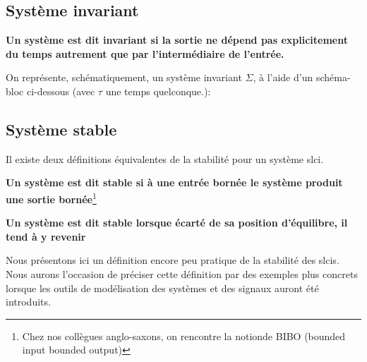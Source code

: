 \subsection{Système invariant}
\textbf{Un système est dit invariant si la sortie ne dépend pas 
explicitement du temps autrement que par l'intermédiaire de l'entrée.}

On représente, schématiquement, un système invariant $\Sigma$, à 
l'aide d'un schéma-bloc ci-dessous 
(avec $\tau$ une temps quelconque.): 
\begin{center}
\end{center}

\subsection{Système stable}
Il existe deux définitions équivalentes de la stabilité pour un 
système \gls{slci}.

\textbf{Un système est dit stable si à une entrée bornée le système 
produit une sortie bornée}\footnote{Chez nos collègues anglo-saxons, on 
rencontre la notionde BIBO (\og bounded input bounded output\fg)}

\textbf{Un système est dit stable lorsque écarté de sa position d'équilibre, 
il tend à y revenir}

Nous présentons ici un définition encore peu pratique de 
la stabilité des \glspl{slci}. Nous aurons l'occasion de préciser
cette définition par des exemples plus concrets lorsque les outils
de modélisation des systèmes et des signaux auront été introduits.

